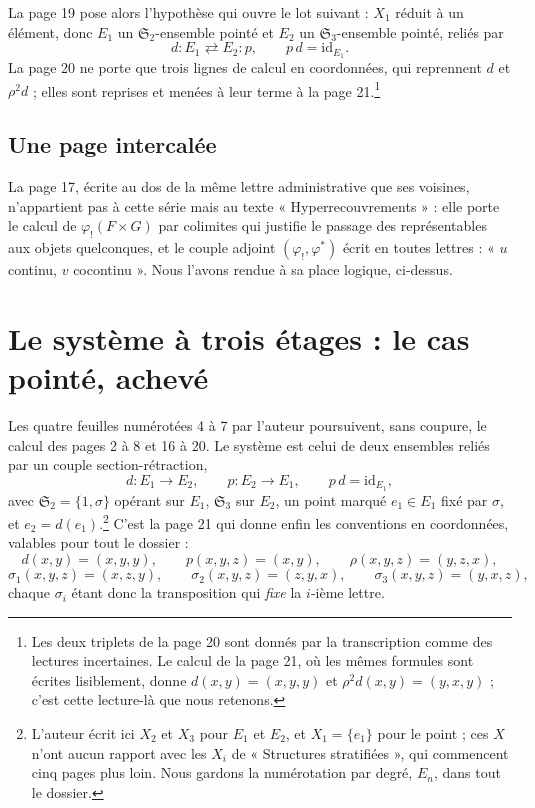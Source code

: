 \documentclass[11pt,a4paper]{article}
\begin{document}
La page 19 pose alors l'hypothèse qui ouvre le lot suivant : $X_{1}$ réduit à un
élément, donc $E_{1}$ un $\mathfrak{S}_{2}$-ensemble pointé et $E_{2}$ un
$\mathfrak{S}_{3}$-ensemble pointé, reliés par
\[
  d \colon E_{1} \rightleftarrows E_{2} \colon p, \qquad p\,d = \mathrm{id}_{E_{1}}.
\]
La page 20 ne porte que trois lignes de calcul en coordonnées, qui reprennent
$d$ et $\rho^{2}d$ ; elles sont reprises et menées à leur terme à la page
21.\footnote{Les deux triplets de la page 20 sont donnés par la transcription
comme des lectures incertaines. Le calcul de la page 21, où les mêmes formules
sont écrites lisiblement, donne $d(x,y) = (x,y,y)$ et
$\rho^{2}d(x,y) = (y,x,y)$ ; c'est cette lecture-là que nous retenons.}

\subsection*{Une page intercalée}

La page 17, écrite au dos de la même lettre administrative que ses voisines,
n'appartient pas à cette série mais au texte « Hyperrecouvrements » : elle
porte le calcul de $\varphi_{!}(F \times G)$ par colimites qui justifie le
passage des représentables aux objets quelconques, et le couple adjoint
$(\varphi_{!}, \varphi^{*})$ écrit en toutes lettres : « $u$ continu, $v$
cocontinu ». Nous l'avons rendue à sa place logique, ci-dessus.

\section*{Le système à trois étages : le cas pointé, achevé}

Les quatre feuilles numérotées 4 à 7 par l'auteur poursuivent, sans coupure, le
calcul des pages 2 à 8 et 16 à 20. Le système est celui de deux ensembles reliés
par un couple section-rétraction,
\[
  d \colon E_{1} \longrightarrow E_{2}, \qquad
  p \colon E_{2} \longrightarrow E_{1}, \qquad p\,d = \mathrm{id}_{E_{1}},
\]
avec $\mathfrak{S}_{2} = \{1,\sigma\}$ opérant sur $E_{1}$, $\mathfrak{S}_{3}$
sur $E_{2}$, un point marqué $e_{1} \in E_{1}$ fixé par $\sigma$, et
$e_{2} = d(e_{1})$.\footnote{L'auteur écrit ici $X_{2}$ et $X_{3}$ pour $E_{1}$
et $E_{2}$, et $X_{1} = \{e_{1}\}$ pour le point ; ces $X$ n'ont aucun rapport
avec les $X_{i}$ de « Structures stratifiées », qui commencent cinq pages plus
loin. Nous gardons la numérotation par degré, $E_{n}$, dans tout le dossier.}
C'est la page 21 qui donne enfin les conventions en coordonnées, valables pour
tout le dossier :
\[
  d(x,y) = (x,y,y), \qquad p(x,y,z) = (x,y), \qquad
  \rho(x,y,z) = (y,z,x),
\]
\[
  \sigma_{1}(x,y,z) = (x,z,y), \qquad \sigma_{2}(x,y,z) = (z,y,x), \qquad
  \sigma_{3}(x,y,z) = (y,x,z),
\]
chaque $\sigma_{i}$ étant donc la transposition qui \emph{fixe} la $i$-ième
lettre.
\end{document}
